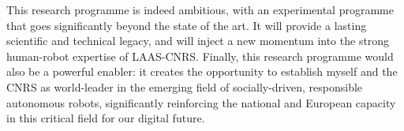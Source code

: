 This research programme is indeed ambitious, with an experimental programme that
goes significantly beyond the state of the art. It will provide a lasting
scientific and technical legacy, and will inject a new momentum into the strong
human-robot expertise of LAAS-CNRS. Finally, this research programme would also
be a powerful enabler: it creates the opportunity to establish myself and the
CNRS as world-leader in the emerging field of socially-driven, responsible
autonomous robots, significantly reinforcing the national and European capacity
in this critical field for our digital future.

